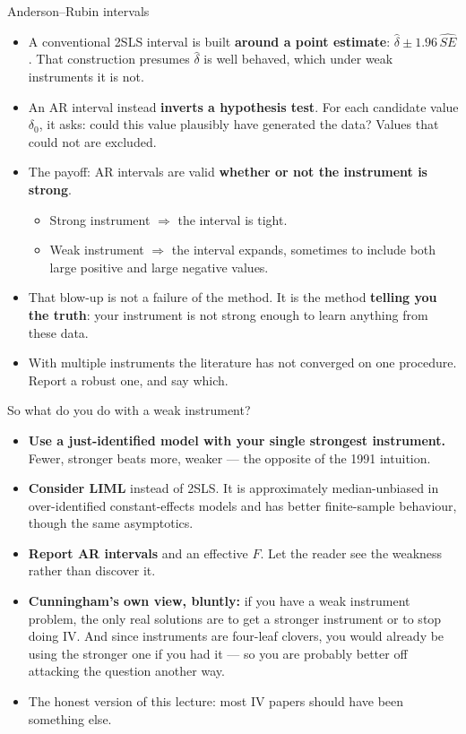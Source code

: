 \documentclass[
  11pt,
  ignorenonframetext,
  aspectratio=169,
]{beamer}
\providecommand{\tightlist}{%
  \setlength{\itemsep}{0pt}\setlength{\parskip}{0pt}}
\begin{document}
\begin{frame}{Anderson--Rubin intervals}
\protect{}\label{andersonrubin-intervals}
\begin{itemize}
\tightlist
\item
  A conventional 2SLS interval is built \textbf{around a point
  estimate}: \(\hat\delta \pm 1.96\,\widehat{SE}\). That construction
  presumes \(\hat\delta\) is well behaved, which under weak instruments
  it is not.
\item
  An AR interval instead \textbf{inverts a hypothesis test}. For each
  candidate value \(\delta_0\), it asks: could this value plausibly have
  generated the data? Values that could not are excluded.
\item
  The payoff: AR intervals are valid \textbf{whether or not the
  instrument is strong}.

  \begin{itemize}
  \tightlist
  \item
    Strong instrument \(\Rightarrow\) the interval is tight.
  \item
    Weak instrument \(\Rightarrow\) the interval expands, sometimes to
    include both large positive and large negative values.
  \end{itemize}
\item
  That blow-up is not a failure of the method. It is the method
  \textbf{telling you the truth}: your instrument is not strong enough
  to learn anything from these data.
\item
  With multiple instruments the literature has not converged on one
  procedure. Report a robust one, and say which.
\end{itemize}
\end{frame}

\begin{frame}{So what do you do with a weak instrument?}
\protect{}\label{so-what-do-you-do-with-a-weak-instrument}
\begin{itemize}
\tightlist
\item
  \textbf{Use a just-identified model with your single strongest
  instrument.} Fewer, stronger beats more, weaker --- the opposite of
  the 1991 intuition.
\item
  \textbf{Consider LIML} instead of 2SLS. It is approximately
  median-unbiased in over-identified constant-effects models and has
  better finite-sample behaviour, though the same asymptotics.
\item
  \textbf{Report AR intervals} and an effective \(F\). Let the reader
  see the weakness rather than discover it.
\item
  \textbf{Cunningham's own view, bluntly:} if you have a weak instrument
  problem, the only real solutions are to get a stronger instrument or
  to stop doing IV. And since instruments are four-leaf clovers, you
  would already be using the stronger one if you had it --- so you are
  probably better off attacking the question another way.
\item
  The honest version of this lecture: most IV papers should have been
  something else.
\end{itemize}
\end{frame}
\end{document}
